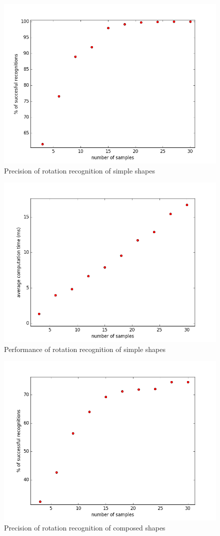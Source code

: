 \begin{description}
\begin{description}
\begin{figure}
\centering
\includegraphics[width=.8\linewidth]{ext/rotation_simple_precision.png}
\caption{Precision of rotation recognition of simple shapes}
\label{fig:rotation_simple_precision}
\end{figure}

\begin{figure}
\centering
\includegraphics[width=.8\linewidth]{ext/rotation_simple_speed.png}
\caption{Performance of rotation recognition of simple shapes}
\label{fig:rotation_simple_speed}
\end{figure}

\begin{figure}
\centering
\includegraphics[width=.8\linewidth]{ext/rotation_comp_precision.png}
\caption{Precision of rotation recognition of composed shapes}
\label{fig:rotation_comp_precision}
\end{figure}


\end{description}
\end{description}
